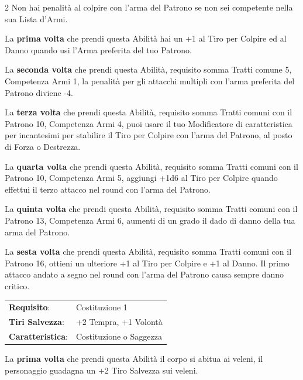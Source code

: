 \begin{multicols}{2}
Non hai penalità al colpire con l'arma del Patrono se non sei competente nella sua Lista d'Armi.

La \textbf{prima volta} che prendi questa Abilità hai un +1 al Tiro per Colpire ed al Danno quando usi l'Arma preferita del tuo Patrono.

La \textbf{seconda volta} che prendi questa Abilità, requisito somma Tratti comune 5, Competenza Armi 1, la penalità per gli attacchi multipli con l'arma preferita del Patrono diviene -4.

La \textbf{terza volta} che prendi questa Abilità, requisito somma Tratti comuni con il Patrono 10, Competenza Armi 4, puoi usare il tuo Modificatore di caratteristica per incantesimi per stabilire il Tiro per Colpire con l'arma del Patrono, al posto di Forza o Destrezza.

La \textbf{quarta volta} che prendi questa Abilità, requisito somma Tratti comuni con il Patrono 10, Competenza Armi 5, aggiungi +1d6 al Tiro per Colpire quando effettui il terzo attacco nel round con l'arma del Patrono.

La \textbf{quinta volta} che prendi questa Abilità, requisito somma Tratti comuni con il Patrono 13, Competenza Armi 6, aumenti di un grado il dado di danno della tua arma del Patrono.

La \textbf{sesta volta} che prendi questa Abilità, requisito somma Tratti comuni con il Patrono 16, ottieni un ulteriore +1 al Tiro per Colpire e +1 al Danno. Il primo attacco andato a segno nel round con l'arma del Patrono causa sempre danno critico.


%

\hspace{-0.2cm}\begin{tabularx}{\linewidth}{l@{\hspace{8pt}}X}
\rowcolor{gray!20}\textbf{Requisito}: & Costituzione 1\\
\textbf{Tiri Salvezza}: & +2 Tempra, +1 Volontà\\
\rowcolor{gray!20}\textbf{Caratteristica}: & Costituzione o Saggezza\\
\end{tabularx}\smallskip


La \textbf{prima volta} che prendi questa Abilità il corpo si abitua ai veleni, il personaggio guadagna un +2 Tiro Salvezza sui veleni.


\end{multicols}

